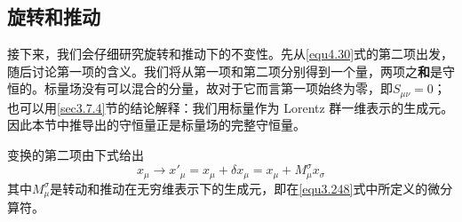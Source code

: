 \subsection{旋转和推动}\label{sec4.5.3}
接下来，我们会仔细研究旋转和推动下的不变性。先从\eqref{equ4.30}式的第二项出发，随后讨论第一项的含义。我们将从第一项和第二项分别得到一个量，两项之{\bfseries 和}是守恒的。标量场没有可以混合的分量，故对于它而言第一项始终为零，即$S_{\mu\nu}=0$；也可以用\ref{sec3.7.4}节的结论解释：我们用标量作为 Lorentz 群一维表示的生成元。因此本节中推导出的守恒量正是标量场的完整守恒量。

变换的第二项由下式给出
\begin{equation}
x_\mu \rightarrow {x'}_\mu = x_\mu + \delta x_\mu = x_\mu + M_\mu^\sigma x_\sigma \label{equ4.42}
\end{equation}
其中$M_\mu^\sigma$是转动和推动在无穷维表示下的生成元，即在\eqref{equ3.248}式中所定义的微分算符。

